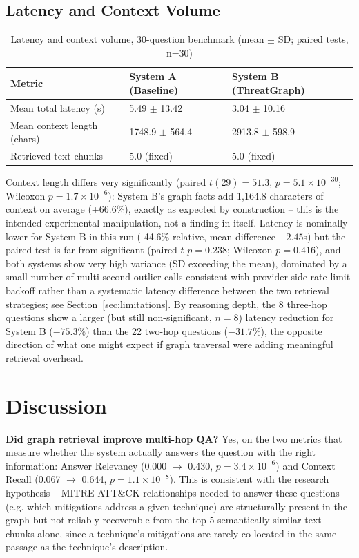 \documentclass[conference]{IEEEtran}
\begin{document}
\subsection{Latency and Context Volume}
\begin{table}[h]
\centering
\caption{Latency and context volume, 30-question benchmark (mean $\pm$ SD; paired tests, n=30)}
\label{tab:latency}
\begin{tabular}{@{}lll@{}}
\toprule
Metric & System A (Baseline) & System B (ThreatGraph) \\
\midrule
Mean total latency (s) & 5.49 $\pm$ 13.42 & 3.04 $\pm$ 10.16 \\
Mean context length (chars) & 1748.9 $\pm$ 564.4 & 2913.8 $\pm$ 598.9 \\
Retrieved text chunks & 5.0 (fixed) & 5.0 (fixed) \\
\bottomrule
\end{tabular}
\end{table}

Context length differs very significantly (paired $t(29)=51.3$, $p=5.1\times10^{-30}$;
Wilcoxon $p=1.7\times10^{-6}$): System B's graph facts add 1{,}164.8 characters
of context on average (+66.6\%), exactly as expected by construction -- this
is the intended experimental manipulation, not a finding in itself. Latency
is nominally lower for System B in this run (-44.6\% relative, mean
difference $-2.45$s) but the paired test is far from significant (paired-$t$
$p=0.238$; Wilcoxon $p=0.416$), and both systems show very high variance
(SD exceeding the mean), dominated by a small number of multi-second outlier
calls consistent with provider-side rate-limit backoff rather than a
systematic latency difference between the two retrieval strategies; see
Section~\ref{sec:limitations}. By reasoning depth, the 8 three-hop questions
show a larger (but still non-significant, $n=8$) latency reduction for
System B ($-75.3\%$) than the 22 two-hop questions ($-31.7\%$), the opposite
direction of what one might expect if graph traversal were adding
meaningful retrieval overhead.

\section{Discussion}

\textbf{Did graph retrieval improve multi-hop QA?} Yes, on the two metrics
that measure whether the system actually answers the question with the
right information: Answer Relevancy (0.000 $\to$ 0.430,
$p=3.4\times10^{-6}$) and Context Recall (0.067 $\to$ 0.644,
$p=1.1\times10^{-8}$). This is consistent with the research hypothesis --
MITRE ATT\&CK relationships needed to answer these questions (e.g. which
mitigations address a given technique) are structurally present in the
graph but not reliably recoverable from the top-5 semantically similar text
chunks alone, since a technique's mitigations are rarely co-located in the
same passage as the technique's description.
\end{document}
